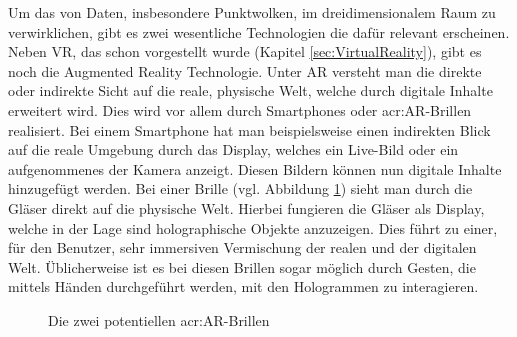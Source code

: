 Um das  von Daten, insbesondere Punktwolken, im dreidimensionalem Raum zu verwirklichen, gibt es zwei wesentliche Technologien die dafür relevant erscheinen. Neben VR, das schon vorgestellt wurde (Kapitel \ref{sec:VirtualReality}), gibt es noch die Augmented Reality Technologie. Unter AR versteht man die direkte oder indirekte Sicht auf die reale, physische Welt, welche durch digitale Inhalte erweitert wird. Dies wird vor allem durch Smartphones oder \acrshort{acr:AR}-Brillen realisiert. Bei einem Smartphone hat man beispielsweise einen indirekten Blick auf die reale Umgebung durch das Display, welches ein Live-Bild oder ein aufgenommenes der Kamera anzeigt. Diesen Bildern können nun digitale Inhalte hinzugefügt werden. Bei einer Brille (vgl. Abbildung \ref{fig:AR-Brillen}) sieht man durch die Gläser direkt auf die physische Welt. Hierbei fungieren die Gläser als Display, welche in der Lage sind holographische Objekte anzuzeigen. Dies führt zu einer, für den Benutzer, sehr immersiven Vermischung der realen und der digitalen Welt. Üblicherweise ist es bei diesen Brillen sogar möglich durch Gesten, die mittels Händen durchgeführt werden, mit den Hologrammen zu interagieren.\\

\begin{figure}%
    \centering
    \qquad
    \caption{Die zwei potentiellen \acrshort{acr:AR}-Brillen}\label{fig:AR-Brillen}%
\end{figure}

